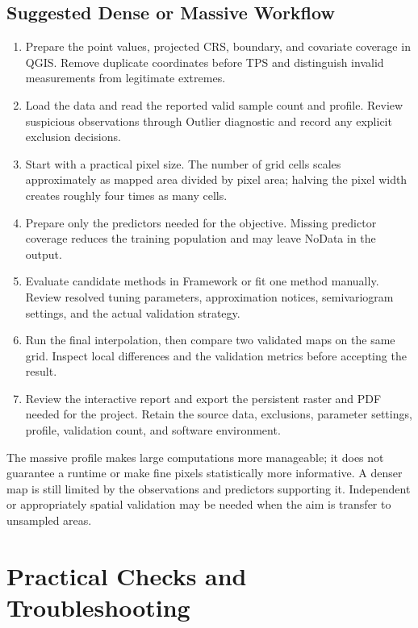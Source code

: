 \documentclass[11pt,a4paper]{article}
\begin{document}
\subsection{Suggested Dense or Massive Workflow}

\begin{enumerate}
    \item Prepare the point values, projected CRS, boundary, and covariate coverage in QGIS. Remove duplicate coordinates before TPS and distinguish invalid measurements from legitimate extremes.
    \item Load the data and read the reported valid sample count and profile. Review suspicious observations through Outlier diagnostic and record any explicit exclusion decisions.
    \item Start with a practical pixel size. The number of grid cells scales approximately as mapped area divided by pixel area; halving the pixel width creates roughly four times as many cells.
    \item Prepare only the predictors needed for the objective. Missing predictor coverage reduces the training population and may leave NoData in the output.
    \item Evaluate candidate methods in Framework or fit one method manually. Review resolved tuning parameters, approximation notices, semivariogram settings, and the actual validation strategy.
    \item Run the final interpolation, then compare two validated maps on the same grid. Inspect local differences and the validation metrics before accepting the result.
    \item Review the interactive report and export the persistent raster and PDF needed for the project. Retain the source data, exclusions, parameter settings, profile, validation count, and software environment.
\end{enumerate}

\begin{infobox}
The massive profile makes large computations more manageable; it does not guarantee a runtime or make fine pixels statistically more informative. A denser map is still limited by the observations and predictors supporting it. Independent or appropriately spatial validation may be needed when the aim is transfer to unsampled areas.
\end{infobox}

\section{Practical Checks and Troubleshooting}
\end{document}
